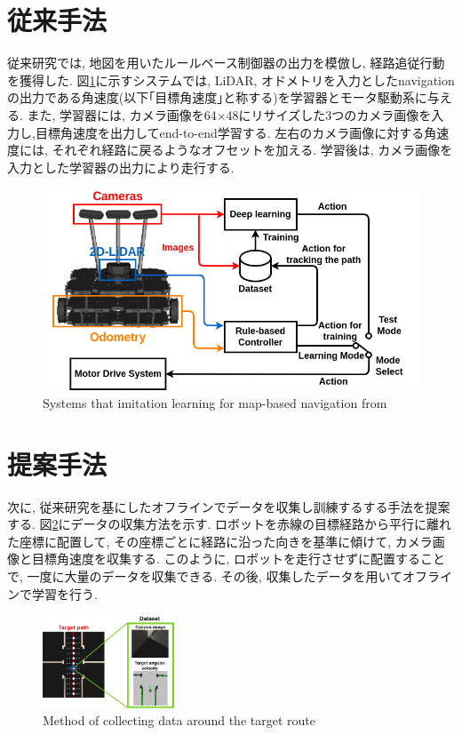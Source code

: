\documentclass[10pt]{ujarticle}
\begin{document}
    \section{従来手法}%
    従来研究では, 地図を用いたルールベース制御器の出力を模倣し, 経路追従行動を獲得した. 図\ref{Fig:si2020-okada}に示すシステムでは, LiDAR, オドメトリを入力としたnavigation\cite{navigation}の出力である角速度(以下｢目標角速度｣と称する)を学習器とモータ駆動系に与える. また, 学習器には, カメラ画像を64×48にリサイズした3つのカメラ画像を入力し,目標角速度を出力してend-to-end学習する. 左右のカメラ画像に対する角速度には, それぞれ経路に戻るようなオフセットを加える. 学習後は, カメラ画像を入力とした学習器の出力により走行する. 

    \begin{figure}[h]
        \centering
        \includegraphics[keepaspectratio, scale=0.3]{fig/si2020-okada.png}
        \caption{Systems that imitation learning for map-based navigation from\cite{si2020-okada}}
        \label{Fig:si2020-okada}
    \end{figure}

    \section{提案手法}%
    次に, 従来研究を基にしたオフラインでデータを収集し訓練するする手法を提案する. 図\ref{Fig:collect}にデータの収集方法を示す. ロボットを赤線の目標経路から平行に離れた座標に配置して, その座標ごとに経路に沿った向きを基準に傾けて, カメラ画像と目標角速度を収集する. このように, ロボットを走行させずに配置することで, 一度に大量のデータを収集できる. その後, 収集したデータを用いてオフラインで学習を行う. 

    \begin{figure}[h]
        \centering
        \includegraphics[width=0.35\textwidth]{fig/collect-data2.png}
        \caption{Method of collecting data around the target route}
        \label{Fig:collect}
    \end{figure}
\end{document}
